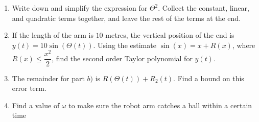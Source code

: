 \begin{enumerate}
\begin{enumerate}
        \item Write down and simplify the expression for $\Theta^2$. Collect the constant, linear, and quadratic terms together, and leave the rest of the terms at the end. 

        
        \item If the length of the arm is $10$ metres, the vertical position of the end is $y(t) = 10 \sin(\Theta(t))$. Using the estimate $\sin(x) = x + R(x)$, where $R(x) \leq \dfrac{x^2}{2}$, find the second order Taylor polynomial for $y(t)$.
        
        \item  The remainder for part $b)$ is $R(\Theta(t)) + R_2(t)$. Find a bound on this error term.  

        \item Find a value of $\omega$ to make sure the robot arm catches a ball within a certain time

        
    \end{enumerate}
		
\end{enumerate}
